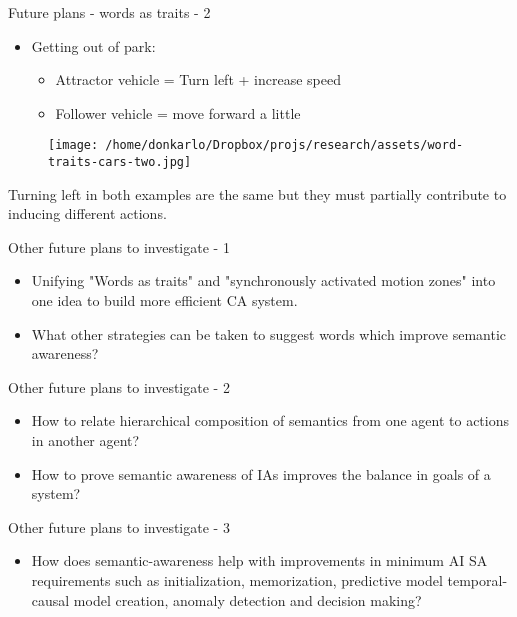 \documentclass[unknownkeysallowed]{beamer}
\begin{document}
	\begin{frame}{Future plans - words as traits - 2}
		\begin{itemize}
			\item Getting out of park:
			\begin{itemize}
				\item Attractor vehicle = Turn left + increase speed
				\item Follower vehicle =  move forward a little
			\end{itemize}
		\end{itemize}
		\begin{figure}
			\texttt{[image: /home/donkarlo/Dropbox/projs/research/assets/word-traits-cars-two.jpg]}
			\caption{}
		\end{figure}
		Turning left in both examples are the same but they must partially contribute to inducing different actions. 
	\end{frame}


	\begin{frame}{Other future plans to investigate - 1}
		\begin{itemize}
			\item Unifying "Words as traits" and "synchronously activated motion zones" into one idea to build more efficient CA system.
			\item What other strategies can be taken to suggest words which improve semantic awareness?
		\end{itemize}
	\end{frame}
	\begin{frame}{Other future plans to investigate - 2}
		\begin{itemize}
			\item How to relate hierarchical composition of semantics from one agent to actions in another agent?
			\item How to prove semantic awareness of IAs improves the balance in goals of a system?
		\end{itemize}
	\end{frame}

	\begin{frame}{Other future plans to investigate - 3}
		\begin{itemize}
			\item How does semantic-awareness help with improvements in minimum AI SA requirements such as initialization, memorization, predictive model temporal-causal model creation, anomaly detection and decision making?  
		\end{itemize}
	\end{frame}
\end{document}
